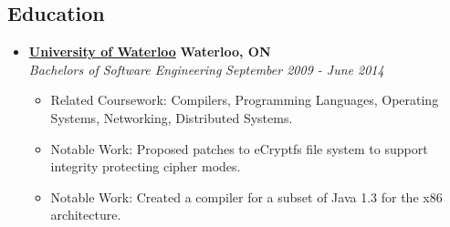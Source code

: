 \documentclass[10pt,letterpaper]{article}
\begin{document}
\subsection*{Education}
  \begin{itemize}
    \parskip=-0.1em

    \item[]
    {\href{http://www.uwaterloo.ca}{\textbf{University of Waterloo}} \hfill
      \textbf{Waterloo, ON}}
    \\
    {\emph{Bachelors of Software Engineering} \hfill
      \emph{September 2009 - June 2014}}

    \begin{itemize}[label=\textbullet]
      \item Related Coursework: Compilers, Programming Languages, Operating
        Systems, Networking, Distributed Systems.
      \item Notable Work: Proposed patches to eCryptfs file system to support
        integrity protecting cipher modes.
      \item Notable Work: Created a compiler for a subset of Java 1.3 for the
        x86 architecture.
    \end{itemize}
  \end{itemize}
\end{document}
